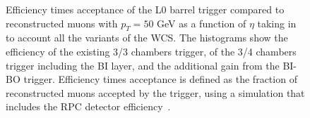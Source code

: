 \begin{figure}[h]
	\centering
\end{figure}	
\begin{figure}[h]
	\centering
	\caption{Efficiency times acceptance of the L0 barrel trigger compared to reconstructed muons with $p_{T} = 50$ GeV as a function of $\eta$ taking in to account all the variants of the WCS. The histograms show the efficiency of  the existing 3/3 chambers trigger, of   the 3/4 chambers trigger including the BI layer, and   the additional gain from the BI-BO trigger. Efficiency times acceptance is defined as the fraction of reconstructed muons accepted by the trigger, using a simulation that includes the RPC detector efficiency~\cite{Marcoccia:2693982}.}
	\label{fig:allcasesBMBO}
\end{figure}

